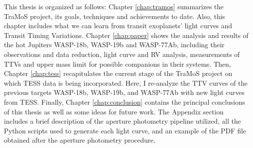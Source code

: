 This thesis is organized as follows: Chapter \ref{chap:tramos} summarizes the TraMoS project, its goals, techniques and achievements to date. Also, this chapter includes what we can learn from transit exoplanets' light curves and Transit Timing Variations. Chapter \ref{chap:paper} shows the analysis and results of the hot Jupiters WASP-18b, WASP-19b and WASP-77Ab, including  their observations and data reduction, light curve and RV analysis, measurements of TTVs and upper mass limit for possible companions in their systems. Then, Chapter \ref{chap:tess}  recapitulates the current stage of the TraMoS project on which TESS data is being incorporated. Here, I re-analyze the TTV curves of the previous targets WASP-18b, WASP-19b, and WASP-77Ab with new light curves from TESS. Finally, Chapter \ref{chap:conclusion} contains the principal conclusions of this thesis as well as some ideas for future work. The Appendix section includes a brief description of the aperture photometry pipeline utilized, all the Python scripts used to generate each light curve, and an example of the PDF file obtained after the aperture photometry procedure.

